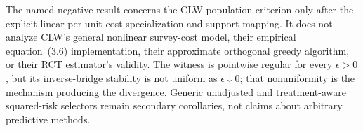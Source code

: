 The named negative result concerns the CLW population criterion only after the explicit linear per-unit cost specialization and support mapping. It does not analyze CLW's general nonlinear survey-cost model, their empirical equation~(3.6) implementation, their approximate orthogonal greedy algorithm, or their RCT estimator's validity. The witness is pointwise regular for every \(\epsilon>0\), but its inverse-bridge stability is not uniform as \(\epsilon\downarrow0\); that nonuniformity is the mechanism producing the divergence. Generic unadjusted and treatment-aware squared-risk selectors remain secondary corollaries, not claims about arbitrary predictive methods.